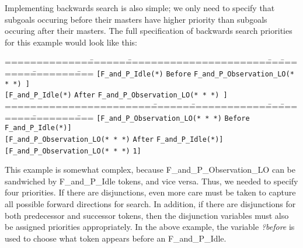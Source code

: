 Implementing backwards search is also simple; we only need to specify
that subgoals occuring before their masters have higher priority than
subgoals occuring after their masters.  The full specification of
backwards search priorities for this example would look like this:

\begin{tabbing}
=============\=======\=======================\===\========\========\====\kill
{\tt[F\_and\_P\_Idle(*)} \> {\tt Before} \> {\tt  F\_and\_P\_Observation\_LO(* * *) ]}  \\
{\tt[F\_and\_P\_Idle(*)} \> {\tt After} \> {\tt  F\_and\_P\_Observation\_LO(* * *) ]}  \\
=======================\=======\=============\===\========\========\====\kill
{\tt[F\_and\_P\_Observation\_LO(* * *)} \> {\tt Before} \> {\tt  F\_and\_P\_Idle(*)]}  \\
{\tt[F\_and\_P\_Observation\_LO(* * *)} \> {\tt After} \> {\tt  F\_and\_P\_Idle(*)]}  \\
{\tt[F\_and\_P\_Observation\_LO(* * *)} \> {\tt 1]}  \\
\end{tabbing}

This example is somewhat complex, because F\_and\_P\_Observation\_LO can
be sandwiched by F\_and\_P\_Idle tokens, and vice versa.  Thus, we needed
to specify four priorities.  If there are disjunctions, even more care must
be taken to capture all possible forward directions for search.
In addition, if there are disjunctions for both predecessor and successor
tokens, then the disjunction variables must also be assigned priorities
appropriately.  In the above example, the variable {\em ?before} is used to
choose what token appears before an F\_and\_P\_Idle. 



\begin{figure}[btph]
\centerline{
}
\caption{\label{searchdir} }
\end{figure}










